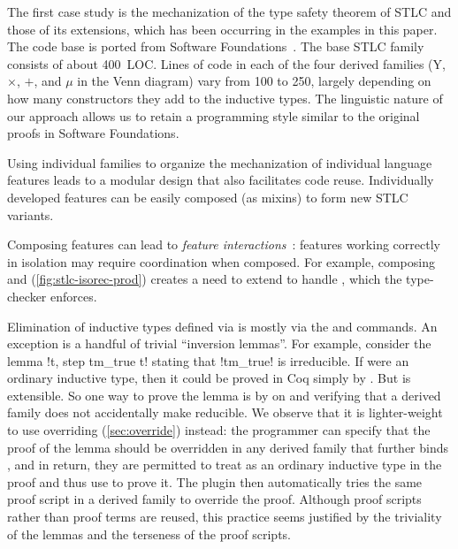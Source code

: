 



The first case study is the mechanization of the type safety theorem of
STLC and those of its extensions,
which has been occurring in the examples in this paper.
The code base is ported from Software Foundations~\cite{sf-pl}.
%
The base STLC family consists of about 400~LOC.
Lines of code in each of the four derived families
($\mathrm{Y}$, $\times$, $+$, and $\mu$ in the Venn diagram)
vary from 100 to 250, largely depending on how many constructors they
add to the inductive types.
%
The linguistic nature of our approach allows us to retain a programming
style similar to the original proofs in Software Foundations.



Using individual families to organize the mechanization of individual
language features leads to a modular design that also facilitates code reuse.
%
Individually developed features can be easily composed (as mixins) to
form new STLC variants.

Composing features can lead to \emph{feature interactions}~\cite{batory2011feature}:
features working correctly in isolation may require coordination when composed.
For example, composing  and 
(\cref{fig:stlc-isorec-prod}) creates a need to extend  to
handle , which the type-checker enforces.

Elimination of inductive types defined via  is
mostly via the  and  commands.
An exception is a handful of trivial ``inversion lemmas''.
For example, consider the lemma \lsti!\forall t, \neg step tm_true t!
stating that \lsti!tm_true! is irreducible.
If  were an ordinary inductive type, then it could be proved in Coq
simply by .
But  is extensible. So one way to prove the lemma is
by  on  and verifying that
a derived family does not accidentally make  reducible.
%
We observe that it is lighter-weight to use overriding (\cref{sec:override}) instead:
the programmer can specify that the proof of the lemma should be overridden
in any derived family that further binds ,
and in return, they are permitted to treat  as an ordinary
inductive type in the proof and thus use  to prove it.
The plugin then automatically tries the same proof script in a derived
family to override the proof. Although proof scripts rather
than proof terms are reused, this practice seems justified
by the triviality of the lemmas and the terseness of the proof scripts.

